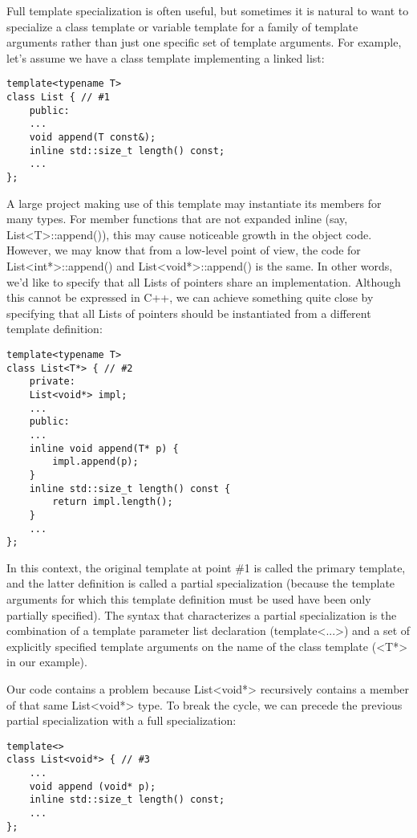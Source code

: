 Full template specialization is often useful, but sometimes it is natural to want to specialize a class template or variable template for a family of template arguments rather than just one specific set of template arguments. For example, let’s assume we have a class template implementing a linked list:

\begin{lstlisting}[style=styleCXX]
template<typename T>
class List { // #1
	public:
	...
	void append(T const&);
	inline std::size_t length() const;
	...
};
\end{lstlisting}

A large project making use of this template may instantiate its members for many types. For member functions that are not expanded inline (say, List<T>::append()), this may cause noticeable growth in the object code. However, we may know that from a low-level point of view, the code for List<int*>::append() and List<void*>::append() is the same. In other words, we’d like to specify that all Lists of pointers share an implementation. Although this cannot be expressed in C++, we can achieve something quite close by specifying that all Lists of pointers should be instantiated from a different template definition:

\begin{lstlisting}[style=styleCXX]
template<typename T>
class List<T*> { // #2
	private:
	List<void*> impl;
	...
	public:
	...
	inline void append(T* p) {
		impl.append(p);
	}
	inline std::size_t length() const {
		return impl.length();
	}
	...
};
\end{lstlisting}

In this context, the original template at point \#1 is called the primary template, and the latter definition is called a partial specialization (because the template arguments for which this template definition must be used have been only partially specified). The syntax that characterizes a partial specialization is the combination of a template parameter list declaration (template<...>) and a set of explicitly specified template arguments on the name of the class template (<T*> in our example).

Our code contains a problem because List<void*> recursively contains a member of that same List<void*> type. To break the cycle, we can precede the previous partial specialization with a full specialization:

\begin{lstlisting}[style=styleCXX]
template<>
class List<void*> { // #3
	...
	void append (void* p);
	inline std::size_t length() const;
	...
};
\end{lstlisting}

